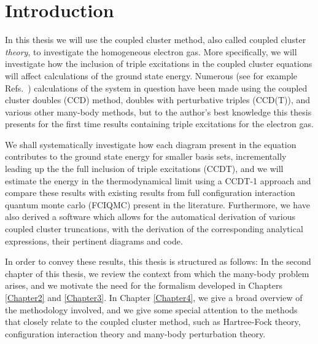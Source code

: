 

\chapter{Introduction} %

\label{Preface} %



In this thesis we will use the coupled cluster method, also called
coupled cluster \emph{theory}, to investigate the homogeneous electron
gas. More specifically, we will investigate how the inclusion of triple
excitations in the coupled cluster equations will affect calculations
of the ground state energy.  Numerous (see for example
Refs.~\cite{Baardsen2014, Shepherd2012, Roggero2013}) calculations of
the system in question have been made using the coupled cluster doubles
(CCD) method, doubles with perturbative triples (CCD(T)), and various
other many-body methods, but to the author's best knowledge this
thesis presents for the first time results containing triple
excitations for the electron gas.

We shall systematically investigate how each diagram present in the
equation contributes to the ground state energy for smaller basis
sets, incrementally leading up the the full inclusion of triple
excitations (CCDT), and we will estimate the energy in the
thermodynamical limit using a CCDT-1 \cite{ShavittBartlett2009}
approach and compare these results with existing results from full
configuration interaction quantum monte carlo (FCIQMC) present in the
literature.  Furthermore, we have also derived a software which allows for the automatical derivation
of various coupled cluster truncations, with the derivation of the corresponding analytical
expressions, their pertinent diagrams and code.

In order to convey these results, this thesis is structured as follows:
In the second chapter of this thesis, we review the
context from which the many-body problem arises, and we motivate the
need for the formalism developed in Chapters \ref{Chapter2}
and \ref{Chapter3}. In Chapter \ref{Chapter4}, we give a broad
overview of the methodology involved, and we give some special
attention to the methods that closely relate to the coupled cluster
method, such as Hartree-Fock theory, configuration interaction theory
and many-body perturbation theory.

